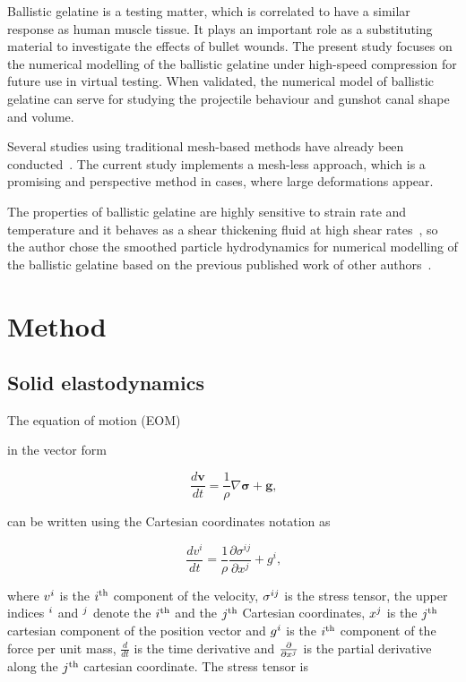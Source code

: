 \documentclass{svproc}
\newcommand{\reva}[1]{{\color{black}#1}}
\newcommand{\revb}[1]{{\color{black}#1}}
\begin{document}
Ballistic gelatine is a testing matter, which is correlated to have a similar response as human muscle tissue. It plays an important role as a substituting material to investigate the effects of bullet wounds. The present study focuses on the numerical modelling of the ballistic gelatine under high-speed compression for future use in virtual testing. \revb{When validated, the numerical model of ballistic gelatine can serve for studying the projectile behaviour and gunshot canal shape and volume.}

Several studies using traditional mesh-based methods have already been conducted~\cite{Awoukeng:2014,Yoon:2015,Chen:2020}. The current study implements a mesh-less approach, which is a promising and perspective method in cases, where large deformations appear.

The properties of ballistic gelatine are highly sensitive to strain rate and temperature and it behaves as a shear thickening fluid at high shear rates~\revb{\cite{Subhash:2012}}, so the author chose the smoothed particle hydrodynamics for numerical modelling of the ballistic gelatine based on the previous published work of other authors~\cite{Taddei:2015,Frissane:2019,Khalil:2019}.

%
\section{Method}
%
\subsection{Solid elastodynamics}
%
The equation of motion (EOM) \reva{in the vector form

\begin{equation}
\label{eq:fluid}
\frac{d\bm v}{dt}=\frac{1}{\rho}\nabla\bm\sigma+\bm g
\mbox{,}
\end{equation}

\noindent
can be written using the Cartesian coordinates notation as}

\begin{equation}
\frac{d v^i}{dt}=\frac{1}{\rho}\frac{\partial\sigma^{ij}}{\partial x^j}+g^i
\mbox{,}
\end{equation}

\noindent
where $v^\reva{i}$ is the $\reva{i}^{\mbox{\scriptsize th}}$ component of the velocity, $\sigma^{\reva{ij}}$ is the stress tensor, the upper \revb{indices} $^\reva{i}$ and $^\reva{j}$ denote the $\reva{i}^{\mbox{\scriptsize th}}$ and the $\reva{j}^{\mbox{\scriptsize th}}$ Cartesian coordinates, $x^\reva{j}$ is the $\reva{j}^{\mbox{\scriptsize th}}$ cartesian component of the position vector and $g^\reva{i}$ is the $\reva{i}^{\mbox{\scriptsize th}}$ component of the force per unit mass, $\frac{d}{dt}$ is the time derivative and $\frac{\partial}{\partial x^\reva{j}}$ is the partial derivative along the $\reva{j}^{\mbox{\scriptsize th}}$ cartesian coordinate. The stress tensor is
\end{document}

